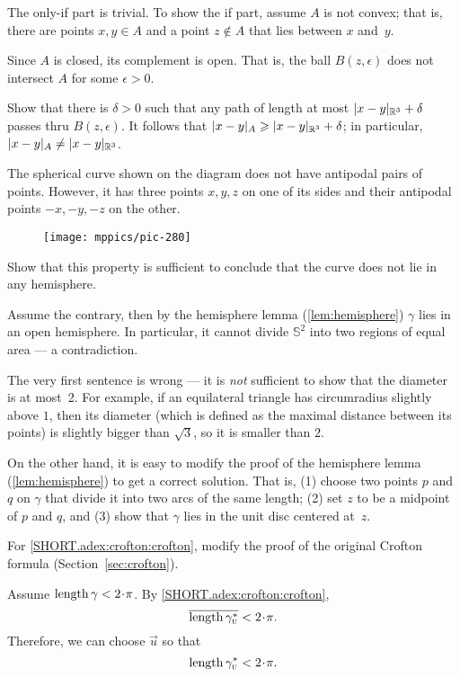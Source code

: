 \begin{multicols}{2}
The only-if part is trivial.
To show the if part, assume $A$ is not convex;
that is, there are points $x,y\in A$ and a point $z\notin A$ that lies between $x$ and~$y$.

Since $A$ is closed, its complement is open.
That is, the ball $B(z,\epsilon)$ does not intersect $A$ for some $\epsilon>0$.

Show that there is $\delta>0$ such that any path of length at most $\dist{x}{y}{\mathbb{R}^3}+\delta$ passes thru $B(z,\epsilon)$.
It follows that $\dist{x}{y}A\ge \dist{x}{y}{\mathbb{R}^3}+\delta$; 
in particular, $\dist{x}{y}A\ne \dist{x}{y}{\mathbb{R}^3}$.

The spherical curve shown on the diagram does not have antipodal pairs of points.
However, it has three points $x,y,z$ on one of its sides and their antipodal points $-x,-y,-z$ on the other.

\begin{wrapfigure}[6]{r}{23 mm}
\vskip-6mm
\centering
\texttt{[image: mppics/pic-280]}
\vskip0mm
\end{wrapfigure}

Show that this property is sufficient to conclude that the curve does not lie in any hemisphere.

Assume the contrary, then by the hemisphere lemma (\ref{lem:hemisphere}) $\gamma$ lies in an open hemisphere.
In particular, it cannot divide $\mathbb{S}^2$ into two regions of equal area --- a contradiction.

The very first sentence is wrong --- it is \textit{not} sufficient to show that the diameter is at most~2.
For example, if an equilateral triangle has circumradius slightly above $1$,
then its diameter (which is defined as the maximal distance between its points) is slightly bigger than $\sqrt3$, so it is smaller than $2$.

On the other hand, it is easy to modify the proof of the hemisphere lemma (\ref{lem:hemisphere}) to get a correct solution.
That is, (1) choose two points $p$ and $q$ on $\gamma$ that divide it into two arcs of the same length;
(2) set $z$ to be a midpoint of $p$ and $q$,
and (3) show that $\gamma$ lies in the unit disc centered at~$z$.


For \ref{SHORT.adex:crofton:crofton}, modify the proof of the original Crofton formula
(Section~\ref{sec:crofton}).

Assume $\length \gamma<2\cdot\pi$.
By \ref{SHORT.adex:crofton:crofton},
\[\overline{\length \gamma^*_{\vec u}}<2\cdot\pi.\]
Therefore, we can choose ${\vec u}$ so that 
\[\length \gamma^*_{\vec u}<2\cdot\pi.\]


\end{multicols}
